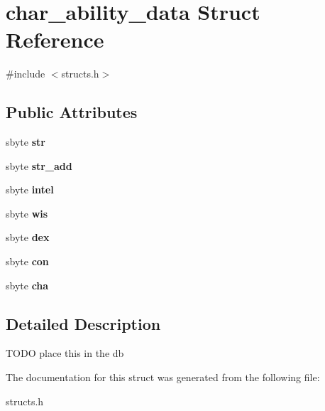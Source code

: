\hypertarget{structchar__ability__data}{}\section{char\+\_\+ability\+\_\+data Struct Reference}
\label{structchar__ability__data}


{\ttfamily \#include $<$structs.\+h$>$}

\subsection*{Public Attributes}
\begin{DoxyCompactItemize}
\item 
\mbox{\label{structchar__ability__data_a4c9a6a640d84267e57bc30c2bdf28b85}} 
sbyte {\bfseries str}
\item 
\mbox{\label{structchar__ability__data_a2ddfdcf3a890f598f6ee0648edf30d9e}} 
sbyte {\bfseries str\+\_\+add}
\item 
\mbox{\label{structchar__ability__data_af95a0e30b162182c74b6e19ce101b310}} 
sbyte {\bfseries intel}
\item 
\mbox{\label{structchar__ability__data_a3bfcafb7292aed798484d40d9ab22150}} 
sbyte {\bfseries wis}
\item 
\mbox{\label{structchar__ability__data_a77e66d85a2a51b9fdd5ba7d7c31af9a3}} 
sbyte {\bfseries dex}
\item 
\mbox{\label{structchar__ability__data_ad968c1e457e31b7462c7f694cb02fcbd}} 
sbyte {\bfseries con}
\item 
\mbox{\label{structchar__ability__data_a1a2d879566d5b4e50095f053e4294f2a}} 
sbyte {\bfseries cha}
\end{DoxyCompactItemize}


\subsection{Detailed Description}
T\+O\+DO place this in the db 

The documentation for this struct was generated from the following file\+:\begin{DoxyCompactItemize}
\item 
structs.\+h\end{DoxyCompactItemize}
